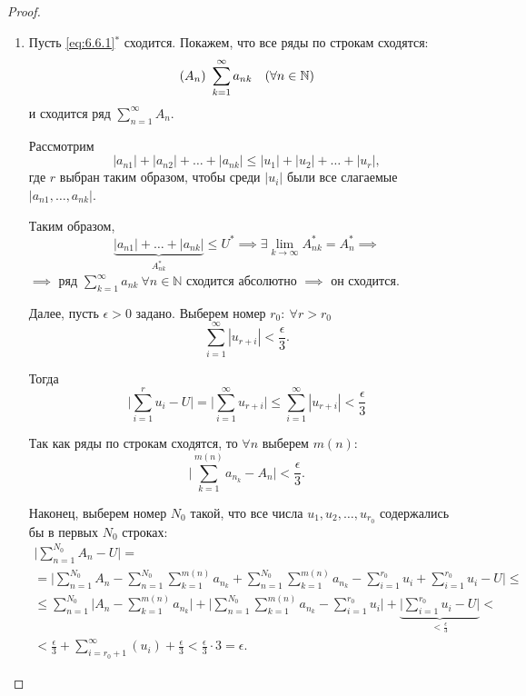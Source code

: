 \begin{proof}\leavevmode
    \begin{enumerate}
        \item Пусть \ref{eq:6.6.1}$ ^* $ сходится. Покажем, что все ряды по строкам сходятся:
              \[
                  (A_n) \ \sum_{k=1}^{\infty}a_{nk} \quad (\forall n \in \mathbb{N})
              \]
              и сходится ряд $ \sum_{n=1}^{\infty}A_n $.

              Рассмотрим
              \[
                  |a_{n1}| + |a_{n2}| + \ldots + |a_{nk}| \leqslant |u_1| + |u_2| + \ldots + |u_r|,
              \]
              где $r$ выбран таким образом, чтобы среди $|u_i|$ были все слагаемые $|a_{n1}, \ldots, a_{nk}|$.

              Таким образом,
              \[
                  \underbrace{|a_{n1}| + \ldots + |a_{nk}|}_{A_{nk}^*} \leqslant U^* \implies \exists \underset{k\rightarrow\infty}{\lim}A_{nk}^* = A_n^* \implies
              \]
              $\implies$ ряд $\sum_{k=1}^{\infty}a_{nk} \ \forall n \in \mathbb{N}$ сходится абсолютно $\implies$ он сходится.

              Далее, пусть $\epsilon > 0$ задано. Выберем номер $r_0: \ \forall r > r_0$
              \[
                  \sum_{i=1}^{\infty}|u_{r+i}| < \frac{\epsilon}{3}.
              \]

              Тогда
              \[
                  \bigg|\sum_{i=1}^{r} u_i - U\bigg| = \bigg| \sum_{i=1}^{\infty}u_{r + i}\bigg| \leqslant \sum_{i=1}^{\infty}|u_{r + i}| < \frac{\epsilon}{3}
              \]

              Так как ряды по строкам сходятся, то $\forall n$ выберем $m(n)$:
              \[
                  \bigg|\sum_{k=1}^{m(n)}a_{n_k} - A_n\bigg| < \frac{\epsilon}{3}.
              \]

              Наконец, выберем номер $N_0$ такой, что все числа $u_1, u_2,\ldots, u_{r_0}$ содержались бы в первых $N_0$ строках:
              \begin{multline*}
                  \bigg|\sum_{n=1}^{N_0}A_n - U\bigg| = \\
                  = \bigg|\sum_{n=1}^{N_0}A_n - \sum_{n=1}^{N_0}\sum_{k=1}^{m(n)}a_{n_k} + \sum_{n=1}^{N_0}\sum_{k=1}^{m(n)}a_{n_k} - \sum_{i=1}^{r_0}u_i + \sum_{i=1}^{r_0}u_i - U\bigg| \leqslant \\
                  \leqslant \sum_{n=1}^{N_0}\bigg|A_n - \sum_{k=1}^{m(n)}a_{n_k}\bigg| + \bigg|\sum_{n=1}^{N_0}\sum_{k=1}^{m(n)}a_{n_k} - \sum_{i=1}^{r_0}u_i\bigg| + \underbrace{\bigg|\sum_{i=1}^{r_0}u_i - U\bigg|}_{<\frac{\epsilon}{3}} < \\
                  < \frac{\epsilon}{3} + \sum_{i=r_0 + 1}^{\infty}(u_i) + \frac{\epsilon}{3} < \frac{\epsilon}{3} \cdot 3 = \epsilon.
              \end{multline*}


\end{enumerate}
\end{proof}
